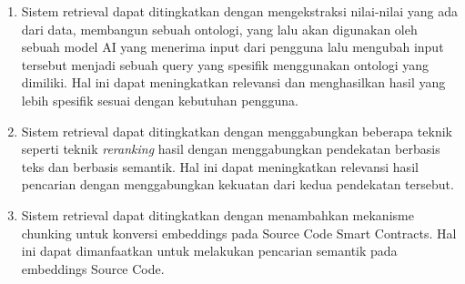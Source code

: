 \begin{enumerate}
    \item Sistem retrieval dapat ditingkatkan dengan mengekstraksi nilai-nilai yang ada dari data, membangun sebuah ontologi, yang lalu akan digunakan oleh sebuah model AI yang menerima input dari pengguna lalu mengubah input tersebut menjadi sebuah query yang spesifik menggunakan ontologi yang dimiliki. Hal ini dapat meningkatkan relevansi dan menghasilkan hasil yang lebih spesifik sesuai dengan kebutuhan pengguna.
    \item Sistem retrieval dapat ditingkatkan dengan menggabungkan beberapa teknik seperti teknik \textit{reranking} hasil dengan menggabungkan pendekatan berbasis teks dan berbasis semantik. Hal ini dapat meningkatkan relevansi hasil pencarian dengan menggabungkan kekuatan dari kedua pendekatan tersebut.
    \item Sistem retrieval dapat ditingkatkan dengan menambahkan mekanisme chunking untuk konversi embeddings pada Source Code Smart Contracts. Hal ini dapat dimanfaatkan untuk melakukan pencarian semantik pada embeddings Source Code.
\end{enumerate}


